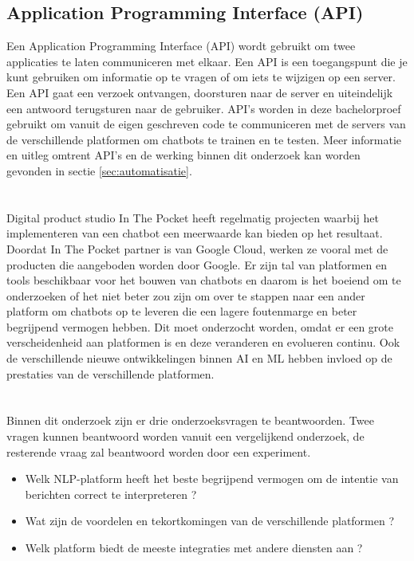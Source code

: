 \subsection{Application Programming Interface (API)}
\label{subsec:begrippen-api}

Een Application Programming Interface (API) wordt gebruikt om twee applicaties te laten communiceren met elkaar. Een API is een toegangspunt die je kunt gebruiken om informatie op te vragen of om iets te wijzigen op een server. Een API gaat een verzoek ontvangen, doorsturen naar de server en uiteindelijk een antwoord terugsturen naar de gebruiker. API’s worden in deze bachelorproef gebruikt om vanuit de eigen geschreven code te communiceren met de servers van de verschillende platformen om chatbots te trainen en te testen. Meer informatie en uitleg omtrent API’s en de werking binnen dit onderzoek kan worden gevonden in sectie \ref{sec:automatisatie}.


\newpage
\section{}
\label{sec:probleemstelling}

Digital product studio In The Pocket heeft regelmatig projecten waarbij het implementeren van een chatbot een meerwaarde kan bieden op het resultaat. Doordat In The Pocket partner is van Google Cloud, werken ze vooral met de producten die aangeboden worden door Google. Er zijn tal van platformen en tools beschikbaar voor het bouwen van chatbots en daarom is het boeiend om te onderzoeken of het niet beter zou zijn om over te stappen naar een ander platform om chatbots op te leveren die een lagere foutenmarge en beter begrijpend vermogen hebben. Dit moet onderzocht worden, omdat er een grote verscheidenheid aan platformen is en deze veranderen en evolueren continu. Ook de verschillende nieuwe ontwikkelingen binnen AI en ML hebben invloed op de prestaties van de verschillende platformen.

\section{}
\label{sec:onderzoeksvraag}

Binnen dit onderzoek zijn er drie onderzoeksvragen te beantwoorden. Twee vragen kunnen beantwoord worden vanuit een vergelijkend onderzoek, de resterende vraag zal beantwoord worden door een experiment.
\begin{itemize}
    \item Welk NLP-platform heeft het beste begrijpend vermogen om de intentie van berichten correct te interpreteren ?
    \item Wat zijn de voordelen en tekortkomingen van de verschillende platformen ?
    \item Welk platform biedt de meeste integraties met andere diensten aan ?
\end{itemize}

